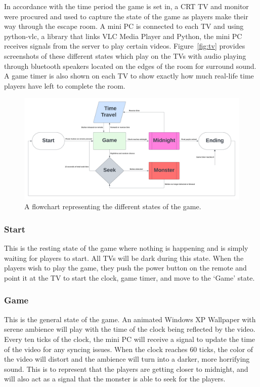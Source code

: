 \documentclass[conference]{IEEEtran}
\begin{document}
\indent In accordance with the time period the game is set in, a CRT TV and monitor were procured and used to capture the state of the game
as players make their way through the escape room. A mini PC is connected to each TV and using python-vlc, a library that links VLC Media Player
and Python, the mini PC receives signals from the server to play certain videos. Figure~\ref{fig:tv} provides screenshots of these different states
which play on the TVs with audio playing through bluetooth speakers located on the edges of the room for surround sound. A game timer is also shown
on each TV to show exactly how much real-life time players have left to complete the room.

\begin{figure}[ht]
    \centering
    \includegraphics[width=0.90\columnwidth]{Images/state_flow.png}
    \caption{A flowchart representing the different states of the game.}
    \label{fig:pir}
\end{figure}

\subsubsection{Start}

\indent This is the resting state of the game where nothing is happening and is simply waiting for players to start. All TVs will be dark during this state.
When the players wish to play the game, they push the power button on the remote and point it at the TV to start the clock, game timer, and move to the `Game' state.

\subsubsection{Game}

\indent This is the general state of the game. An animated Windows XP Wallpaper with serene ambience will play with the time of the clock being reflected by the video.
Every ten ticks of the clock, the mini PC will receive a signal to update the time of the video for any syncing issues. When the clock reaches 60 ticks,
the color of the video will distort and the ambience will turn into a darker, more horrifying sound. This is to represent that the players are getting
closer to midnight, and will also act as a signal that the monster is able to seek for the players.
\end{document}
